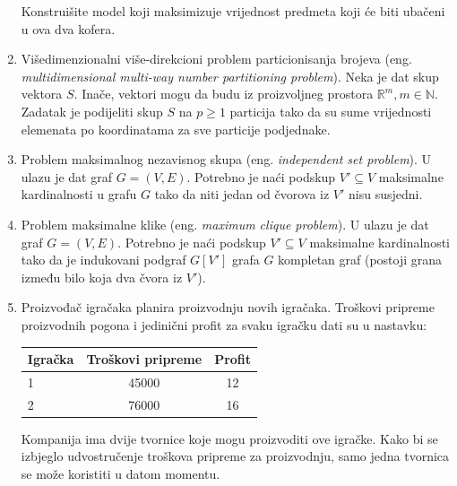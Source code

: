 \documentclass[a4paper, utf8, 11pt, colorlinks]{book}
\begin{document}
\begin{enumerate}
\begin{table}[!ht]
 \end{table}
Konstruišite model koji maksimizuje vrijednost  predmeta koji će biti ubačeni u ova dva kofera. 
\item Višedimenzionalni više-direkcioni problem particionisanja brojeva (eng. \emph{multidimensional multi-way number partitioning problem}). Neka je dat skup vektora $S$. Inače, vektori mogu da budu iz proizvoljneg prostora $\mathbb{R}^m, m \in \mathbb{N}$.   Zadatak je podijeliti skup $S$ na $p \geq 1$ particija tako da su sume vrijednosti  elemenata  po koordinatama za sve particije podjednake. 

\item Problem maksimalnog nezavisnog skupa (eng. \emph{independent set problem}). U ulazu je dat graf $G = (V, E)$. Potrebno je naći podskup $V' \subseteq V$ maksimalne kardinalnosti u grafu $G$ tako da niti jedan od čvorova iz $V'$ nisu susjedni. 
\item Problem maksimalne klike (eng. \emph{maximum clique problem}).   U ulazu je dat graf $G = (V, E)$. Potrebno je naći podskup $V' \subseteq V$ maksimalne kardinalnosti tako da je indukovani podgraf 
$G[V']$ grafa $G$ kompletan graf (postoji grana između bilo koja dva čvora iz $V'$). 
\item %
Proizvođač igračaka planira proizvodnju novih igračaka. Troškovi pripreme proizvodnih pogona i jedinični profit za svaku igračku dati su u nastavku: 
 \begin{table}[H]
	\centering
	\begin{tabular}{l|cc}
	  Igračka &  Troškovi pripreme    & Profit \\ \hline
	  1       &  45000     &  12     \\
	  2       &  76000     &  16     \\	\hline
	\end{tabular} 
\end{table}
 Kompanija ima dvije tvornice koje mogu proizvoditi ove igračke. Kako bi se izbjeglo udvostručenje troškova pripreme za proizvodnju,  samo jedna tvornica se može koristiti u datom momentu. 
 

\end{enumerate}
\end{document}
